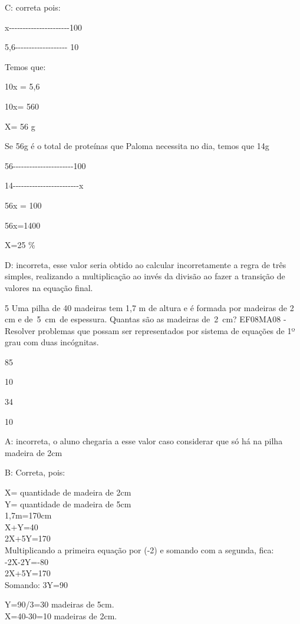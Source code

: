 C: correta pois:

x-\/-\/-\/-\/-\/-\/-\/-\/-\/-\/-\/-\/-\/-\/-\/-\/-\/-\/-\/-\/-\/-100

5,6-\/-\/-\/-\/-\/-\/-\/-\/-\/-\/-\/-\/-\/-\/-\/-\/-\/-\/- 10

Temos que:

10x = 5,6

10x= 560

X= 56 g

Se 56g é o total de proteínas que Paloma necessita no dia, temos que 14g

56-\/-\/-\/-\/-\/-\/-\/-\/-\/-\/-\/-\/-\/-\/-\/-\/-\/-\/-\/-\/-\/-100

14-\/-\/-\/-\/-\/-\/-\/-\/-\/-\/-\/-\/-\/-\/-\/-\/-\/-\/-\/-\/-\/-\/-\/-x

56x = 100

56x=1400

X=25 \%

D: incorreta, esse valor seria obtido ao calcular incorretamente a regra
de três simples, realizando a multiplicação ao invés da divisão ao fazer
a transição de valores na equação final.

\num{5} Uma pilha de 40 madeiras tem 1,7 m de altura e é formada por madeiras
de 2 cm e de~5~cm~de espessura. Quantas são as madeiras de~2~cm?
EF08MA08 - Resolver problemas que possam ser representados por sistema
de equações de 1º grau com duas incógnitas.

\item 85
\item 10
\item 34
\item 10

A: incorreta, o aluno chegaria a esse valor caso considerar que só há na
pilha madeira de 2cm

B: Correta, pois:

X= quantidade de madeira de 2cm\\
Y= quantidade de madeira de 5cm\\
1,7m=170cm\\
X+Y=40\\
2X+5Y=170\\
Multiplicando a primeira equação por (-2) e somando com a segunda,
fica:\\
-2X-2Y=-80\\
2X+5Y=170\\
Somando: 3Y=90

Y=90/3=30 madeiras de 5cm.\\
X=40-30=10 madeiras de 2cm.

